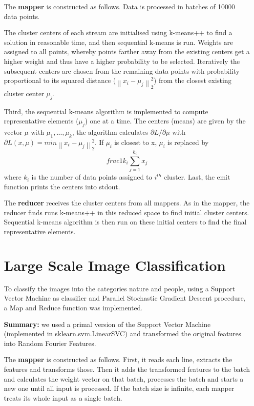 \documentclass[a4paper, 11pt]{article}
\begin{document}
The \textbf{mapper} is constructed as follows. Data is processed in batches of 10000 data points.

The cluster centers of each stream are initialised using k-means++ to find a solution in reasonable time, and then sequential k-means is run. Weights are assigned to all points, whereby points farther away from the existing centers get a higher weight and thus have a higher probability to be selected. Iteratively the subsequent centers are chosen from the remaining data points with probability proportional to its squared distance ($\left \| x_{i} - \mu_{j} \right \|^{2}_{2}$) from the closest existing cluster center $\mu_{j}$.

Third, the sequential k-means algorithm is implemented to compute representative elements ($\mu_{j}$) one at a time. The centers (means) are given by the vector $\mu$ with $\mu_{1},...,\mu_{k}$, the algorithm calculates $\partial L/\partial \mu$ with $ \partial L(x,\mu) = min \left \| x_{i} - \mu_{j} \right \|^{2}_{2}$. If $\mu_{i}$ is closest to x,  $\mu_{i}$ is replaced by $$frac{1}{k_{i}}\sum_{j=1}^{k_{i}}{x_{j}}$$where $k_i$ is the number of data points assigned to $i^{th}$ cluster. 
Last, the emit function prints the centers into stdout.

The \textbf{reducer} receives the cluster centers from all mappers. As in the mapper, the reducer finds runs k-means++ in this reduced space to find initial cluster centers. Sequential k-means algorithm is then run on these initial centers to find the final representative elements. \pagebreak

\section*{Large Scale Image Classification} 
To classify the images into the categories nature and people, using a Support Vector Machine as classifier and Parallel Stochastic Gradient Descent procedure, a Map and Reduce function was implemented. 

\textbf{Summary:} we used a primal version of the Support Vector Machine (implemented in sklearn.svm.LinearSVC) and transformed the original features into Random Fourier Features.

The \textbf{mapper} is constructed as follows. First, it reads each line, extracts the features and transforms those. Then it adds the transformed features to the batch and calculates the weight vector on that batch, processes the batch and starts a new one until all input is processed. If the batch size is infinite, each mapper treats its whole input as a single batch.
\end{document}

